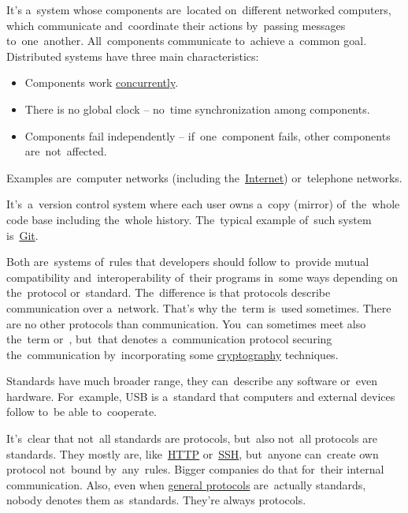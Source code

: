 \label{distributedsystem}
It's a~system whose components are~located on~different networked computers, which communicate and~coordinate their actions by~passing messages to~one~another.
All~components communicate to~achieve a~common goal.
Distributed systems have three main characteristics:
\begin{itemize}
    \item Components work \hyperref[concurrency]{concurrently}.
    \item There is no global clock -- no~time synchronization among components.
    \item Components fail independently -- if~one~component fails, other components are~not~affected.
\end{itemize}
\noindent Examples are~computer networks (including the~\hyperref[internetweb]{Internet}) or~telephone networks.

\label{distributedversioncontrolsystem}
It's~a~version control system where each user owns a~copy (mirror) of~the~whole code base including the~whole history.
The~typical example of~such system is~\hyperref[git]{Git}.

\label{protocolstandard}
Both are~systems of~rules that developers should follow to~provide mutual compatibility and~interoperability of~their programs in~some ways depending on the~protocol or~standard.
The~difference is that protocols describe communication over a~network.
That's why the~term  is~used sometimes.
There are no other protocols than communication.
You~can sometimes meet also the~term  or~, but~that denotes a~communication protocol securing the~communication by~incorporating some \hyperref[cryptography]{cryptography} techniques.

Standards have much broader range, they can~describe any software or~even hardware.
For~example, USB is a~standard that computers and external devices follow to~be able to~cooperate.

\warning It's~clear that not~all standards are protocols, but~also not~all protocols are standards.
They mostly are, like~\hyperref[http]{HTTP} or~\hyperref[ssh]{SSH}, but~anyone can~create own protocol not~bound by~any~rules.
Bigger companies do that for~their internal communication.
Also, even when \hyperref[networkprotocols]{general protocols} are~actually standards, nobody denotes them as~standards.
They're always protocols.

